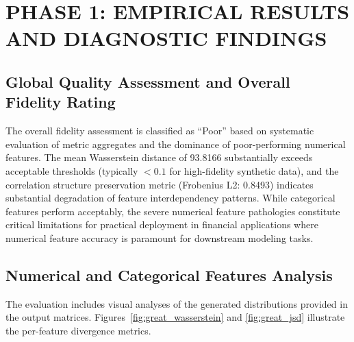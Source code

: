 \documentclass[10pt,conference,a4paper]{IEEEtran}
\begin{document}
\section{PHASE 1: EMPIRICAL RESULTS AND DIAGNOSTIC FINDINGS}

\subsection{Global Quality Assessment and Overall Fidelity Rating}
\begin{table}[htbp]
\centering
\caption{Global Evaluation Metrics Summary (Generation of Realistic Tabular data (GReaT))}
\label{tab:global_great}
\end{table}

The overall fidelity assessment is classified as ``Poor'' based on systematic evaluation of metric aggregates and the dominance of poor-performing numerical features. The mean Wasserstein distance of 93.8166 substantially exceeds acceptable thresholds (typically $< 0.1$ for high-fidelity synthetic data), and the correlation structure preservation metric (Frobenius L2: 0.8493) indicates substantial degradation of feature interdependency patterns. While categorical features perform acceptably, the severe numerical feature pathologies constitute critical limitations for practical deployment in financial applications where numerical feature accuracy is paramount for downstream modeling tasks.

\subsection{Numerical and Categorical Features Analysis}

The evaluation includes visual analyses of the generated distributions provided in the output matrices. Figures~\ref{fig:great_wasserstein} and \ref{fig:great_jsd} illustrate the per-feature divergence metrics.
\end{document}
